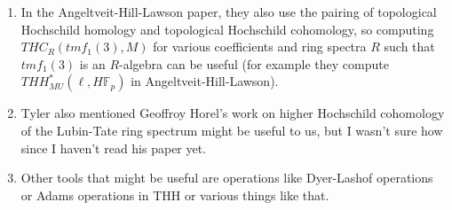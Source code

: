 \documentclass[11pt, oneside]{article}   	%
\begin{document}
\begin{enumerate}
	\item In the Angeltveit-Hill-Lawson paper, they also use the pairing of topological Hochschild homology and topological Hochschild cohomology, so computing $THC_R(tmf_1(3),M)$ for various coefficients and ring spectra $R$ such that $tmf_1(3)$ is an $R$-algebra can be useful (for example they compute $THH_{MU}^*(\ell,H\mathbb{F}_p)$ in Angeltveit-Hill-Lawson). 
	\item Tyler also mentioned Geoffroy Horel's work on higher Hochschild cohomology of the Lubin-Tate ring spectrum might be useful to us, but I wasn't sure how since I haven't read his paper yet. 
	\item Other tools that might be useful are operations like Dyer-Lashof operations or Adams operations in THH or various things like that. 
\end{enumerate}	
	
	
	
\end{document}

